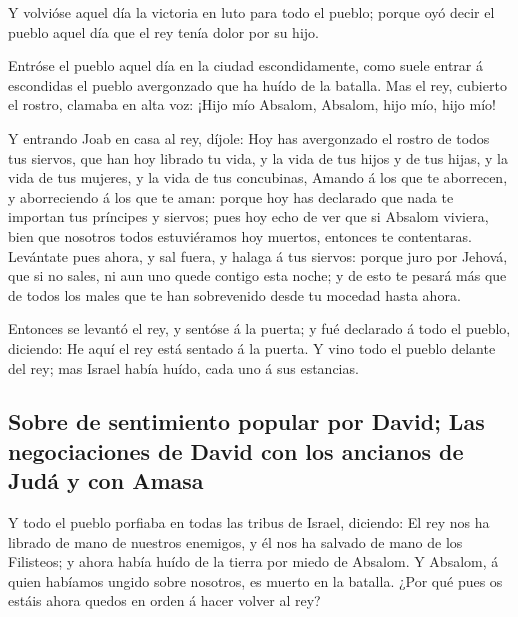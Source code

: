  Y volvióse aquel día la victoria en luto para todo el
pueblo; porque oyó decir el pueblo aquel día que el rey tenía dolor por
su hijo.

 Entróse el pueblo aquel día en la ciudad escondidamente,
como suele entrar á escondidas el pueblo avergonzado que ha huído de la
batalla.  Mas el rey, cubierto el rostro, clamaba en alta
voz: ¡Hijo mío Absalom, Absalom, hijo mío, hijo mío!

 Y entrando Joab en casa al rey, díjole: Hoy has
avergonzado el rostro de todos tus siervos, que han hoy librado tu vida,
y la vida de tus hijos y de tus hijas, y la vida de tus mujeres, y la
vida de tus concubinas,  Amando á los que te aborrecen, y
aborreciendo á los que te aman: porque hoy has declarado que nada te
importan tus príncipes y siervos; pues hoy echo de ver que si Absalom
viviera, bien que nosotros todos estuviéramos hoy muertos, entonces te
contentaras.  Levántate pues ahora, y sal fuera, y halaga
á tus siervos: porque juro por Jehová, que si no sales, ni aun uno quede
contigo esta noche; y de esto te pesará más que de todos los males que
te han sobrevenido desde tu mocedad hasta ahora.

 Entonces se levantó el rey, y sentóse á la puerta; y fué
declarado á todo el pueblo, diciendo: He aquí el rey está sentado á la
puerta. Y vino todo el pueblo delante del rey; mas Israel había huído,
cada uno á sus estancias.

\hypertarget{sobre-de-sentimiento-popular-por-david-las-negociaciones-de-david-con-los-ancianos-de-juduxe1-y-con-amasa}{%
\subsection{Sobre de sentimiento popular por David; Las negociaciones de
David con los ancianos de Judá y con
Amasa}\label{sobre-de-sentimiento-popular-por-david-las-negociaciones-de-david-con-los-ancianos-de-juduxe1-y-con-amasa}}

 Y todo el pueblo porfiaba en todas las tribus de Israel,
diciendo: El rey nos ha librado de mano de nuestros enemigos, y él nos
ha salvado de mano de los Filisteos; y ahora había huído de la tierra
por miedo de Absalom.  Y Absalom, á quien habíamos ungido
sobre nosotros, es muerto en la batalla. ¿Por qué pues os estáis ahora
quedos en orden á hacer volver al rey?

